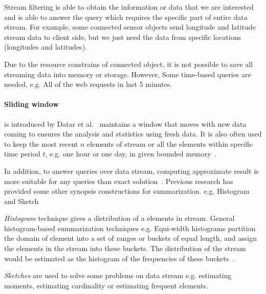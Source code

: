 Stream filtering is able to obtain the information or data that we are
interested and is able to answer the query which requires the specific part of
entire data stream. For example, some connected sensor objects send longitude
and latitude stream data to client side, but we just need the data from specific
locations (longitudes and latitudes).


Due to the resource constrains of connected object, it is not possible to save
all streaming data into memory or storage. However, Some time-based queries are
needed, e.g. All of the web requests in last 5 minutes.

\paragraph{Sliding window} is introduced by Datar et
al.~\cite{datar2002maintaining} maintains a window that moves with new data
coming to ensures the analysis and statistics using fresh data. It is also often
used to keep the most recent $n$ elements of stream or all the elements within
specific time period $t$, e.g. one hour or one day, in given bounded
memory~\cite{leskovec2014mining}. 




In addition, to answer queries over data stream, computing approximate result is
more suitable for any queries than exact solution~\cite{kejariwal2015real}.
Previous research has provided some other synopsis constructions for
summarization. e.g. Histogram~\cite{hesabi2015data, poosala1999approximate} and
Sketch

\emph{Histogram} technique gives a distribution of a elements in stream. General
histogram-based summarization techniques e.g. Equi-width histograms partition
the domain of element into a set of ranges or buckets of equal length, and
assign the elements in the stream into these buckets. The distribution of the
stream would be estimated as the histogram of the frequencies of these
buckets~\cite{kejariwal2015real, ahmed2019data}.

\emph{Sketches} are used to solve some problems on data stream e.g. estimating
moments, estimating cardinality or estimating frequent elements.


